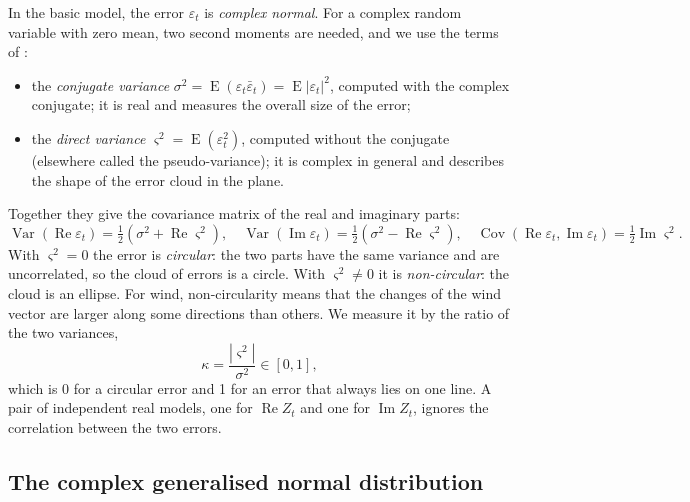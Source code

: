 \documentclass[11pt,a4paper]{article}
\DeclareMathOperator{\E}{E}
\renewcommand{\Re}{\operatorname{Re}}
\renewcommand{\Im}{\operatorname{Im}}
\begin{document}
In the basic model, the error $\varepsilon_t$ is \emph{complex normal}. For a complex random
variable with zero mean, two second moments are needed, and we use the terms of
\citet{svetunkov2024}:
\begin{itemize}
  \item the \emph{conjugate variance} $\sigma^2 = \E(\varepsilon_t\bar\varepsilon_t) =
    \E|\varepsilon_t|^2$, computed with the complex conjugate; it is real and measures the overall
    size of the error;
  \item the \emph{direct variance} $\varsigma^2 = \E(\varepsilon_t^2)$, computed without the
    conjugate (elsewhere called the pseudo-variance); it is complex in general and describes the
    shape of the error cloud in the plane.
\end{itemize}
Together they give the covariance matrix of the real and imaginary parts:
\begin{equation}
  \operatorname{Var}(\Re\varepsilon_t) = \tfrac12(\sigma^2 + \Re\varsigma^2), \quad
  \operatorname{Var}(\Im\varepsilon_t) = \tfrac12(\sigma^2 - \Re\varsigma^2), \quad
  \operatorname{Cov}(\Re\varepsilon_t, \Im\varepsilon_t) = \tfrac12\Im\varsigma^2 .
\end{equation}
With $\varsigma^2 = 0$ the error is \emph{circular}: the two parts have the same variance and are
uncorrelated, so the cloud of errors is a circle. With $\varsigma^2 \neq 0$ it is
\emph{non-circular}: the cloud is an ellipse. For wind, non-circularity means that the changes of
the wind vector are larger along some directions than others. We measure it by the ratio of the
two variances,
\begin{equation}\label{eq:noncirc}
  \kappa = \frac{|\varsigma^2|}{\sigma^2} \in [0, 1],
\end{equation}
which is 0 for a circular error and 1 for an error that always lies on one line. A pair of
independent real models, one for $\Re Z_t$ and one for $\Im Z_t$, ignores the correlation between
the two errors.

\subsection{The complex generalised normal distribution}\label{sec:cgnorm}
\end{document}
